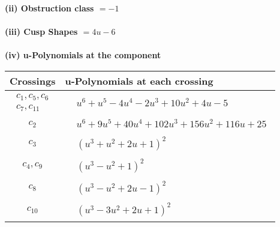 \documentclass[1p]{elsarticle_modified}
\theoremstyle{definition}
\begin{document}
\flushleft \textbf{(ii) Obstruction class $= -1$}\\~\\
\flushleft \textbf{(iii) Cusp Shapes $= 4 u-6$}\\~\\
\newpage\renewcommand{\arraystretch}{1}
\flushleft \textbf{(iv) u-Polynomials at the component}\newline \\
\begin{tabular}{m{50pt}|m{274pt}}
Crossings & \hspace{64pt}u-Polynomials at each crossing \\
\hline $$\begin{aligned}c_{1},c_{5},c_{6}\\c_{7},c_{11}\end{aligned}$$&$\begin{aligned}
&u^6+u^5-4 u^4-2 u^3+10 u^2+4 u-5
\end{aligned}$\\
\hline $$\begin{aligned}c_{2}\end{aligned}$$&$\begin{aligned}
&u^6+9 u^5+40 u^4+102 u^3+156 u^2+116 u+25
\end{aligned}$\\
\hline $$\begin{aligned}c_{3}\end{aligned}$$&$\begin{aligned}
&(u^3+u^2+2 u+1)^2
\end{aligned}$\\
\hline $$\begin{aligned}c_{4},c_{9}\end{aligned}$$&$\begin{aligned}
&(u^3- u^2+1)^2
\end{aligned}$\\
\hline $$\begin{aligned}c_{8}\end{aligned}$$&$\begin{aligned}
&(u^3- u^2+2 u-1)^2
\end{aligned}$\\
\hline $$\begin{aligned}c_{10}\end{aligned}$$&$\begin{aligned}
&(u^3-3 u^2+2 u+1)^2
\end{aligned}$\\
\hline
\end{tabular}\\~\\
\end{document}
